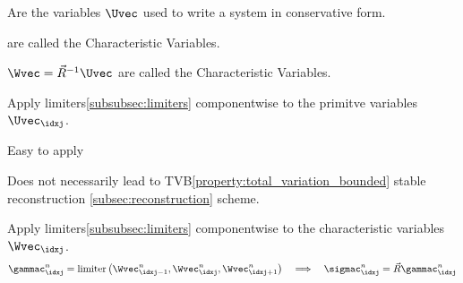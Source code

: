 \begin{defnbox}\nospacing
    \begin{defn}\label{defn:conservative_variables}
        Are the variables $\Uvec$ used to write a system in conservative form.
    \end{defn}
\end{defnbox}
\begin{defnbox}\nospacing
    \begin{defn}\label{defn:primitive_variabels}
        are called the Characteristic Variables.
    \end{defn}
\end{defnbox}
\begin{defnbox}\nospacing
    \begin{defn}\label{defn:characteristic_variabels}
        $\Wvec=\vec{R}^{-1}\Uvec$ are called the Characteristic Variables.
    \end{defn}
\end{defnbox}
\begin{defnbox}\nospacing
    \begin{defn}\label{defn:primitive_reconstruction}
        Apply limiters\cref{subsubsec:limiters} componentwise to the primitve variables $\Uvec_{\idxj}$.
    \end{defn}
\end{defnbox}
\begin{sectionbox}\nospacing
   \begin{minipage}[t]{0.39\textwidth}
       \begin{proslist}
           \item Easy to apply
       \end{proslist}
   \end{minipage}
   \begin{minipage}[c]{0.6\textwidth}
      \begin{conslist}
          \item Does not necessarily lead to TVB\cref{property:total_variation_bounded} stable reconstruction \cref{subsec:reconstruction} scheme.
      \end{conslist}
   \end{minipage}
\end{sectionbox}
\begin{defnbox}\nospacing
    \begin{defn}\label{defn:characteristic_reconstruction}
        Apply limiters\cref{subsubsec:limiters} componentwise to the characteristic variables $\Wvec_{\idxj}$.
        \begin{align}
          \gammac_{\idxj}^{n}=\text{limiter}\left(\Wvec_{\idxj-1}^{n},\Wvec_{\idxj}^{n},\Wvec_{\idxj+1}^{n}\right)&&\implies&&\sigmac_{\idxj}^{n}=\vec{R}\gammac_{\idxj}^{n}
        \end{align}
    \end{defn}
\end{defnbox}
